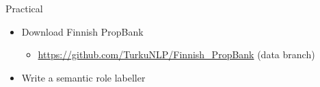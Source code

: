 \documentclass[10pt, compress]{beamer}
\begin{document}

\begin{frame}{Practical}
  
\begin{itemize}
  \item Download Finnish PropBank
  \begin{itemize}
     \item \url{https://github.com/TurkuNLP/Finnish_PropBank} (data branch)
  \end{itemize}
  \item Write a semantic role labeller

\end{itemize}

\end{frame}
\end{document}
